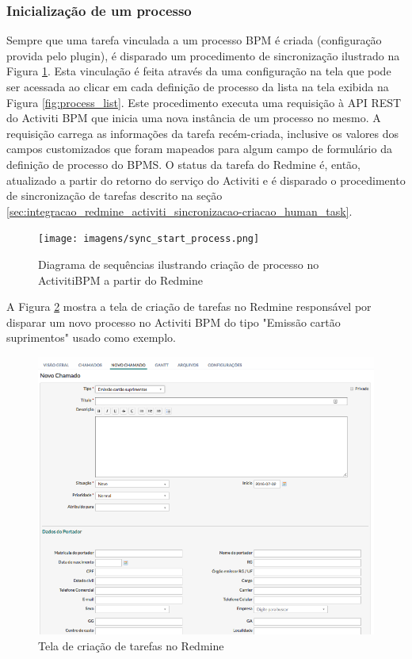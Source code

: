 \subsubsection{Inicialização de um processo}\label{sec:integracao_redmine_activiti_sincronizacao-inicializacao_processo}

Sempre que uma tarefa vinculada a um processo BPM é criada (configuração provida pelo plugin), é disparado um procedimento de sincronização ilustrado na Figura \ref{fig:start_process_diagram}. Esta vinculação é feita através da uma configuração na tela que pode ser acessada ao clicar em cada definição de processo da lista na tela exibida na Figura \ref{fig:process_list}. Este procedimento executa uma requisição à API REST do Activiti BPM que inicia uma nova instância de um processo no mesmo. A requisição carrega as informações da tarefa recém-criada, inclusive os valores dos campos customizados que foram mapeados para algum campo de formulário da definição de processo do BPMS. O status da tarefa do Redmine é, então, atualizado a partir do retorno do serviço do Activiti e é disparado o procedimento de sincronização de tarefas descrito na seção \ref{sec:integracao_redmine_activiti_sincronizacao-criacao_human_task}.

\begin{figure}[H]
\centering
\texttt{[image: imagens/sync\_start\_process.png]}
\caption{Diagrama de sequências ilustrando criação de processo no ActivitiBPM a partir do Redmine}
\label{fig:start_process_diagram}
\end{figure}


A Figura \ref{fig:new_issue} mostra a tela de criação de tarefas no Redmine responsável por disparar um novo processo no Activiti BPM do tipo "Emissão cartão suprimentos" usado como exemplo.

\begin{figure}[H]
\centering
\includegraphics[width=1\textwidth]{imagens/redmine_new_issue.png}
\caption{Tela de criação de tarefas no Redmine}
\label{fig:new_issue}
\end{figure}

